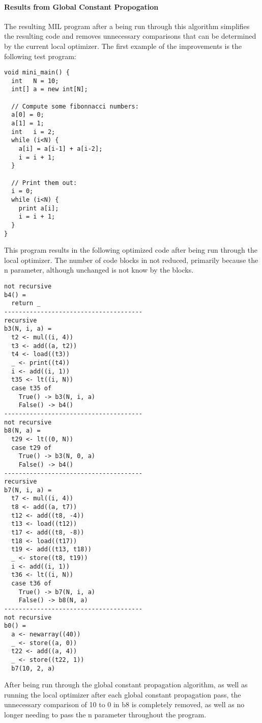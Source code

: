 \documentclass[14pt]{article}
\begin{document}
\paragraph{Results from Global Constant Propogation}
The resulting MIL program after a being run through this algorithm simplifies the resulting code and removes unnecessary comparisons that can be determined by the current local optimizer. The first example of the improvements is the following test program:
\begin{verbatim}
void mini_main() {
  int   N = 10;
  int[] a = new int[N];

  // Compute some fibonnacci numbers:
  a[0] = 0;
  a[1] = 1;
  int   i = 2;
  while (i<N) {
    a[i] = a[i-1] + a[i-2];
    i = i + 1;
  }

  // Print them out:
  i = 0;
  while (i<N) {
    print a[i];
    i = i + 1;
  }
}
\end{verbatim}
This program results in the following optimized code after being run through the local optimizer. The number of code blocks in not reduced, primarily because the n parameter, although unchanged is not know by the blocks.
\pagebreak
\begin{verbatim}
not recursive
b4() =
  return _
--------------------------------------
recursive
b3(N, i, a) =
  t2 <- mul((i, 4))
  t3 <- add((a, t2))
  t4 <- load((t3))
  _ <- print((t4))
  i <- add((i, 1))
  t35 <- lt((i, N))
  case t35 of
    True() -> b3(N, i, a)
    False() -> b4()
--------------------------------------
not recursive
b8(N, a) =
  t29 <- lt((0, N))
  case t29 of
    True() -> b3(N, 0, a)
    False() -> b4()
--------------------------------------
recursive
b7(N, i, a) =
  t7 <- mul((i, 4))
  t8 <- add((a, t7))
  t12 <- add((t8, -4))
  t13 <- load((t12))
  t17 <- add((t8, -8))
  t18 <- load((t17))
  t19 <- add((t13, t18))
  _ <- store((t8, t19))
  i <- add((i, 1))
  t36 <- lt((i, N))
  case t36 of
    True() -> b7(N, i, a)
    False() -> b8(N, a)
--------------------------------------
not recursive
b0() =
  a <- newarray((40))
  _ <- store((a, 0))
  t22 <- add((a, 4))
  _ <- store((t22, 1))
  b7(10, 2, a)
\end{verbatim}
After being run through the global constant propagation algorithm, as well as running the local optimizer after each global constant propagation pass, the unnecessary comparison of 10 to 0 in b8 is completely removed, as well as no longer needing to pass the n parameter throughout the program.\\
\end{document}
